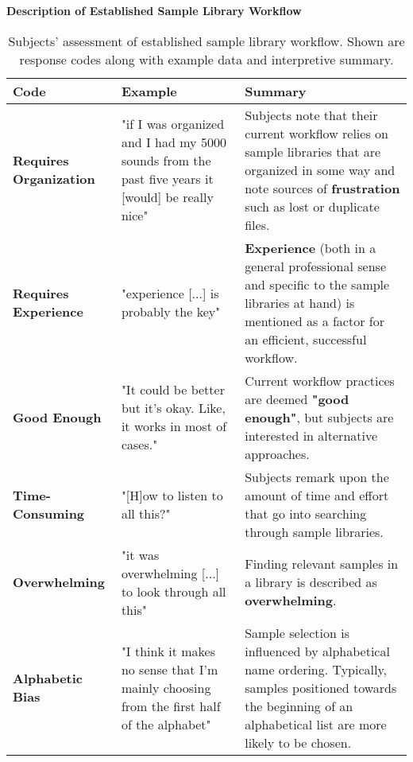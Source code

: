 \begin{table}[!htb]
  \renewcommand{\arraystretch}{1.2}
  \centering
  \textbf{Description of Established Sample Library Workflow} \\ [3mm]
  \footnotesize
  \colorbox{light-bg}{
  \begin{tabular}{ p{4.0cm} p{4.75cm} p{4.75cm} }
  \hline
    \textbf{Code} & \textbf{Example} & \textbf{Summary} \\
    \hline
    \textbf{Requires Organization}
    &
    "if I was organized and I had my 5000 sounds from the past five years it
    [would] be really nice"
    &
    Subjects note that their current workflow relies on sample libraries that
    are organized in some way and note sources of \textbf{frustration} such as
    lost or duplicate files.
    \\
    \textbf{Requires Experience}
    &
    "experience [...] is probably the key"
    &
    \textbf{Experience} (both in a general professional sense and specific to
    the sample libraries at hand) is mentioned as a factor for an efficient,
    successful workflow.
    \\
    \textbf{Good Enough}
    &
    "It could be better but it's okay. Like, it works in most of cases."
    &
    Current workflow practices are deemed \textbf{"good enough"}, but subjects
    are interested in alternative approaches.
    \\
    \textbf{Time-Consuming}
    &
    "[H]ow to listen to all this?"
    &
    Subjects remark upon the amount of time and effort that go into searching
    through sample libraries.
    \\
    \textbf{Overwhelming}
    &
    "it was overwhelming [...] to look through all this"
    &
    Finding relevant samples in a library is described as \textbf{overwhelming}.
    \\
    \textbf{Alphabetic Bias}
    &
    "I think it makes no sense that I'm mainly choosing from the first half of
    the alphabet"
    &
    Sample selection is influenced by alphabetical name ordering. Typically,
    samples positioned towards the beginning of an alphabetical list are more
    likely to be chosen.
    \\
  \end{tabular}}
  \caption[Established Sample Library Workflow Assessment: Response Codes]
  {Subjects' assessment of established sample library workflow. Shown are
  response codes along with example data and interpretive summary.}
  \label{table:current_workflow_assessment}
\end{table}

